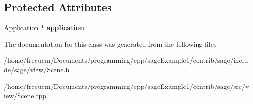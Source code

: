 \subsection*{Protected Attributes}
\begin{DoxyCompactItemize}
\item 
\mbox{\label{classsage_1_1Scene_a06046ccc778f9e7257e777c048c481b9}} 
\mbox{\hyperlink{classsage_1_1Application}{Application}} $\ast$ {\bfseries application}
\end{DoxyCompactItemize}


The documentation for this class was generated from the following files\+:\begin{DoxyCompactItemize}
\item 
/home/frequem/\+Documents/programming/cpp/sage\+Example1/contrib/sage/include/sage/view/Scene.\+h\item 
/home/frequem/\+Documents/programming/cpp/sage\+Example1/contrib/sage/src/view/Scene.\+cpp\end{DoxyCompactItemize}
